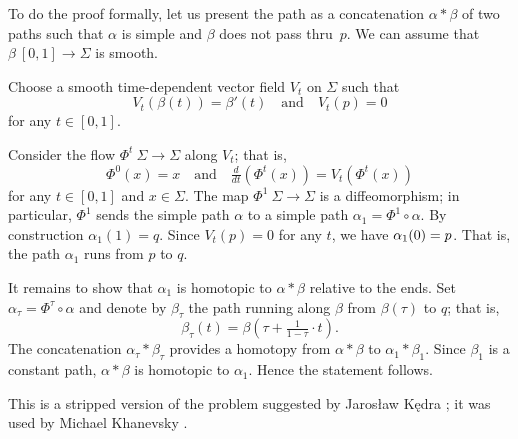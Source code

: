 To do the proof formally,
let us present the path as a concatenation $\alpha*\beta$ of two paths  such that $\alpha$ is simple
and $\beta$ does not pass thru~$p$.
We can assume that $\beta\:[0,1]\to \Sigma$ is smooth.

Choose a smooth time-dependent vector field $V_t$ on $\Sigma$ such that
\[V_t(\beta(t))=\beta'(t)\quad\text{and}\quad V_t(p)=0\]
for any $t\in[0,1]$. 

Consider the flow $\Phi^t\:\Sigma\to \Sigma$ along $V_t$;
that is,
\[\Phi^0(x)=x\quad\text{and}\quad \tfrac{d}{dt}(\Phi^t(x))=V_t(\Phi^t(x))\]
for any $t\in[0,1]$ and $x\in \Sigma$.
The map $\Phi^1\:\Sigma\to \Sigma$ is a diffeomorphism;
in particular, $\Phi^1$ sends the simple path $\alpha$ to a simple path $\alpha_1=\Phi^1\circ\alpha$.
By construction $\alpha_1(1)=q$. 
Since $V_t(p)=0$ for any $t$, we have $\alpha_1(0)\z=p$.
That is, the path $\alpha_1$ runs from $p$ to $q$.

It remains to show that $\alpha_1$ is homotopic to $\alpha*\beta$ relative to the ends.
Set $\alpha_\tau=\Phi^\tau\circ\alpha$ and denote by  $\beta_\tau$ the path running along $\beta$ from $\beta(\tau)$ to $q$;
that is, 
\[\beta_\tau(t)=\beta(\tau+\tfrac1{1-\tau}\cdot t).\]
The concatenation $\alpha_\tau*\beta_\tau$ provides a homotopy from $\alpha*\beta$ to $\alpha_1*\beta_1$. 
Since $\beta_1$ is a constant path, $\alpha*\beta$ is homotopic to $\alpha_1$.
Hence the statement follows.
\qeds

This is a stripped version of the problem suggested by Jaros{\l}aw K\k{e}dra \cite{One-step}; 
it was used by Michael Khanevsky \cite[Lemma 3 in][]{khanevsky}.
